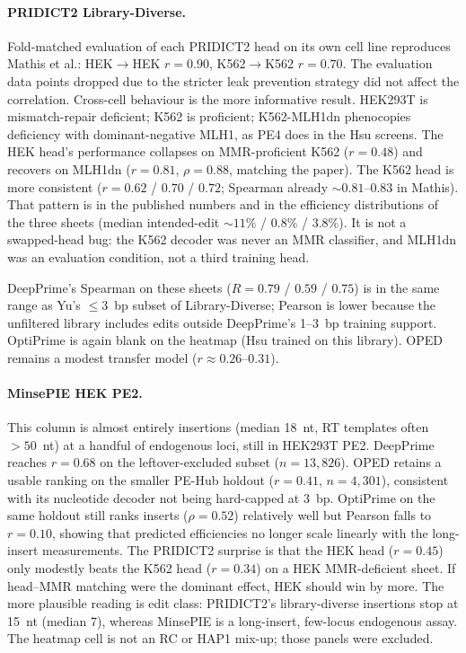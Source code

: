 \documentclass{article}
\begin{document}
\paragraph{PRIDICT2 Library-Diverse.}
Fold-matched evaluation of each PRIDICT2 head on its own cell line reproduces Mathis et al.: HEK$\to$HEK $r = 0.90$, K562$\to$K562 $r = 0.70$\cite{mathisMachineLearningPrediction2024}. The evaluation data points dropped due to the stricter leak prevention strategy did not affect the correlation. Cross-cell behaviour is the more informative result. HEK293T is mismatch-repair deficient; K562 is proficient; K562-MLH1dn phenocopies deficiency with dominant-negative MLH1, as PE4 does in the Hsu screens. The HEK head's performance collapses on MMR-proficient K562 ($r = 0.48$) and recovers on MLH1dn ($r = 0.81$, $\rho = 0.88$, matching the paper). The K562 head is more consistent ($r = 0.62$ / $0.70$ / $0.72$; Spearman already ${\sim}0.81$--$0.83$ in Mathis). That pattern is in the published numbers and in the efficiency distributions of the three sheets (median intended-edit ${\sim}11\%$ / $0.8\%$ / $3.8\%$). It is not a swapped-head bug: the K562 decoder was never an MMR classifier, and MLH1dn was an evaluation condition, not a third training head.

DeepPrime's Spearman on these sheets ($R = 0.79$ / $0.59$ / $0.75$) is in the same range as Yu's $\leq 3$~bp subset of Library-Diverse; Pearson is lower because the unfiltered library includes edits outside DeepPrime's 1--3~bp training support. OptiPrime is again blank on the heatmap (Hsu trained on this library). OPED remains a modest transfer model ($r \approx 0.26$--$0.31$).

\paragraph{MinsePIE HEK PE2.}
This column is almost entirely insertions (median 18~nt, RT templates often $>50$~nt) at a handful of endogenous loci, still in HEK293T PE2. DeepPrime reaches $r = 0.68$ on the leftover-excluded subset ($n = 13{,}826$). OPED retains a usable ranking on the smaller PE-Hub holdout ($r = 0.41$, $n = 4{,}301$), consistent with its nucleotide decoder not being hard-capped at 3~bp. OptiPrime on the same holdout still ranks inserts ($\rho = 0.52$) relatively well but Pearson falls to $r = 0.10$, showing that predicted efficiencies no longer scale linearly with the long-insert measurements. The PRIDICT2 surprise is that the HEK head ($r = 0.45$) only modestly beats the K562 head ($r = 0.34$) on a HEK MMR-deficient sheet. If head--MMR matching were the dominant effect, HEK should win by more. The more plausible reading is edit class: PRIDICT2's library-diverse insertions stop at 15~nt (median 7), whereas MinsePIE is a long-insert, few-locus endogenous assay. The heatmap cell is not an RC or HAP1 mix-up; those panels were excluded.
\end{document}

